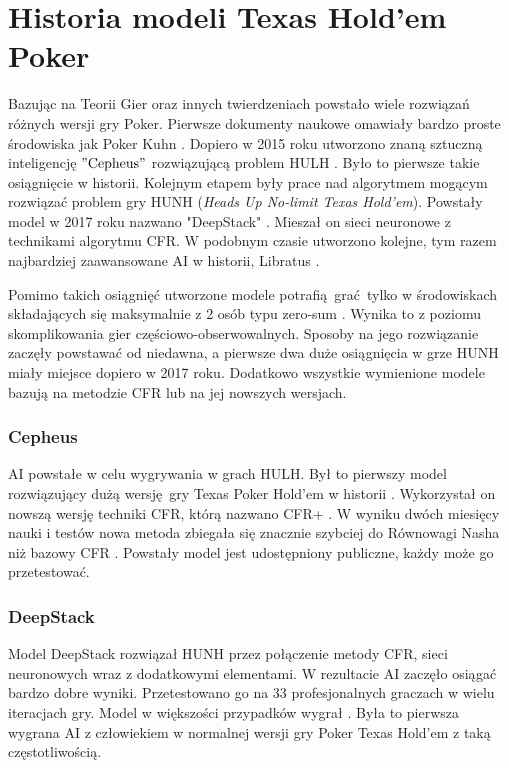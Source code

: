 \documentclass[12pt,oneside,a4paper]{report}
\begin{document}
\section{Historia modeli Texas Hold'em Poker}

Bazując na Teorii Gier oraz innych twierdzeniach powstało wiele rozwiązań różnych wersji gry Poker.
Pierwsze dokumenty naukowe omawiały bardzo proste
środowiska jak Poker Kuhn \cite{DCFR}.
Dopiero w 2015 roku utworzono znaną sztuczną inteligencję $"\text{Cepheus}"$ rozwiązującą problem
HULH \cite{cepheus}. Było to pierwsze takie osiągnięcie w historii. Kolejnym etapem były prace nad
algorytmem mogącym rozwiązać problem gry HUNH (\emph{Heads Up No-limit Texas Hold'em}).
Powstały model w 2017 roku nazwano "DeepStack" \cite{ds}. Mieszał on sieci neuronowe z 
technikami algorytmu CFR. W podobnym czasie utworzono kolejne, tym razem najbardziej zaawansowane AI
w historii, Libratus \cite{libratus}.


Pomimo takich osiągnięć utworzone modele potrafią grać tylko
w środowiskach 
składających się maksymalnie z 2 osób typu zero-sum \cite{libratus} \cite{cepheus} \cite{ds}.  
Wynika to z poziomu skomplikowania gier częściowo-obserwowalnych.
Sposoby na jego rozwiązanie zaczęły powstawać od niedawna, a pierwsze
dwa duże osiągnięcia w grze HUNH miały miejsce dopiero w 2017 roku. Dodatkowo wszystkie wymienione
modele bazują na metodzie CFR lub na jej nowszych wersjach.


\subsubsection{Cepheus}

AI powstałe w celu wygrywania w grach HULH. Był to pierwszy model rozwiązujący dużą wersję gry Texas
Poker Hold'em w historii \cite{cepheus}.  Wykorzystał on nowszą wersję techniki CFR, którą nazwano CFR+
\cite{cepheus}. W wyniku dwóch miesięcy nauki i testów nowa metoda zbiegała się znacznie szybciej do
Równowagi Nasha niż bazowy CFR \cite{cepheus}. Powstały model jest udostępniony publiczne, każdy
może go przetestować.    

\subsubsection{DeepStack}

Model DeepStack rozwiązał HUNH przez połączenie metody CFR, sieci neuronowych wraz z dodatkowymi
elementami. W rezultacie AI zaczęło osiągać bardzo dobre wyniki.
Przetestowano go na 33 profesjonalnych graczach w wielu iteracjach gry. Model w większości
przypadków wygrał \cite{ds}. Była to pierwsza wygrana AI z człowiekiem w normalnej 
wersji gry Poker Texas Hold'em z taką częstotliwością.
\end{document}
